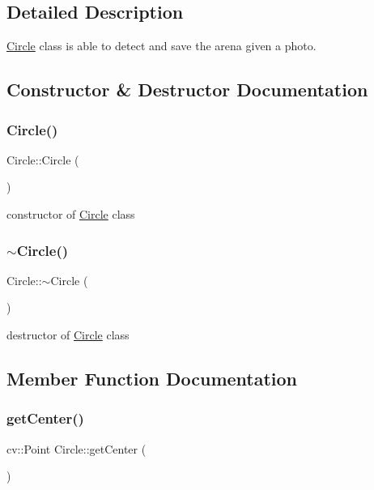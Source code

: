 \subsection{Detailed Description}
\mbox{\hyperlink{class_circle}{Circle}} class is able to detect and save the arena given a photo. 

\subsection{Constructor \& Destructor Documentation}
\mbox{\label{class_circle_ad1ecfcfc7bf34529c6a6d6c448bf70fe}} 
\subsubsection{\texorpdfstring{Circle()}{Circle()}}
{\footnotesize\ttfamily Circle\+::\+Circle (\begin{DoxyParamCaption}{ }\end{DoxyParamCaption})}

constructor of \mbox{\hyperlink{class_circle}{Circle}} class \mbox{\label{class_circle_ae3f30436e645d73e368e8ee55f8d1650}} 
\subsubsection{\texorpdfstring{$\sim$\+Circle()}{~Circle()}}
{\footnotesize\ttfamily Circle\+::$\sim$\+Circle (\begin{DoxyParamCaption}{ }\end{DoxyParamCaption})}

destructor of \mbox{\hyperlink{class_circle}{Circle}} class 

\subsection{Member Function Documentation}
\mbox{\label{class_circle_a60d1af499a6ad295f9f2955c4409dddd}} 
\subsubsection{\texorpdfstring{get\+Center()}{getCenter()}}
{\footnotesize\ttfamily cv\+::\+Point Circle\+::get\+Center (\begin{DoxyParamCaption}{ }\end{DoxyParamCaption})}


